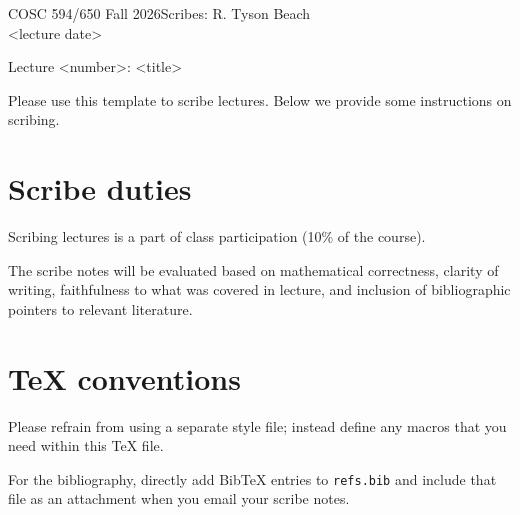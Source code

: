 \documentclass[11pt, a4paper]{article}
\newcommand\coursename{COSC 594/650 Fall 2026}
\newcommand\scribe{R. Tyson Beach}
\newcommand\lecturedate{<lecture date>}
\newcommand\lecturetitle{Lecture <number>: <title>}
\begin{document}
\begin{tcolorbox}
\noindent \coursename \hfill Scribes: \scribe \\
\lecturedate \hfill 
\begin{center}
  {\Large\lecturetitle}
\end{center}
\end{tcolorbox}

\vspace{0.5em}
\noindent Please use this template to scribe lectures. Below we provide some instructions on scribing.

\section{Scribe duties}

Scribing lectures is a part of class participation (10\% of the course).  

The scribe notes will be evaluated based on mathematical correctness, clarity of writing, faithfulness to what was covered in lecture, and inclusion of bibliographic pointers to relevant literature. 

\section{TeX conventions}

Please refrain from using a separate style file; instead define any macros that you need within this TeX file.

For the bibliography, directly add BibTeX entries to \texttt{refs.bib} and include that file as an attachment when you email your scribe notes. 



\end{document}
